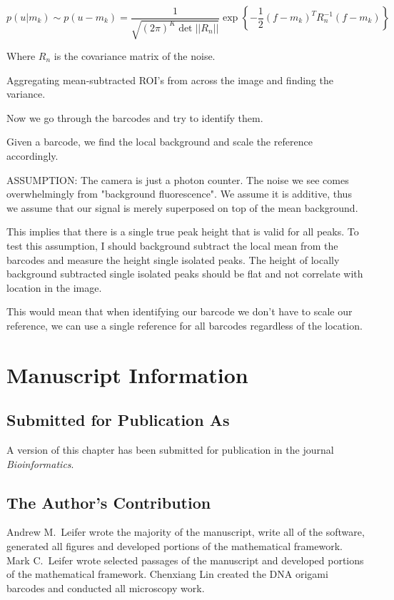 \begin{equation}
p(u|m_k)\sim p(u-m_k) = \frac{1}{  \sqrt{ (2\pi)^K \det || R_n||} } \exp\left\{ -\frac{1}{2}  (f-m_k)^T R_n^{-1} (f-m_k) \right\}
\end{equation}

Where $R_{n}$ is the covariance matrix of the noise.




Aggregating mean-subtracted ROI's from across the image and finding the variance.

Now we go through the barcodes and try to identify them.

Given a barcode, we find the local background and scale the reference accordingly. 

ASSUMPTION: The camera is just a photon counter. The noise we see comes overwhelmingly from "background fluorescence". We assume it is additive, thus we assume that our signal is merely superposed on top of the mean background. 

This implies that there is a single true peak height that is valid for all peaks. To test this assumption, I should background subtract the local mean from the barcodes and measure the height single isolated peaks. The height of locally background subtracted single isolated peaks should be flat and not correlate with location in the image.

This would mean that when identifying our barcode we don't have to scale our reference, we can use a single reference for all barcodes regardless of the location.


\section{Manuscript Information}
\subsection{Submitted for Publication As}
A version of this chapter has been submitted for publication in the journal \textit{Bioinformatics}.

\subsection{The Author's Contribution}
Andrew M.~Leifer wrote the majority of the manuscript, write all of the software, generated all figures and developed portions of the mathematical framework. Mark C.~Leifer wrote selected passages of the manuscript and developed portions of the mathematical framework. Chenxiang Lin created the DNA origami barcodes and conducted all microscopy work. 
 